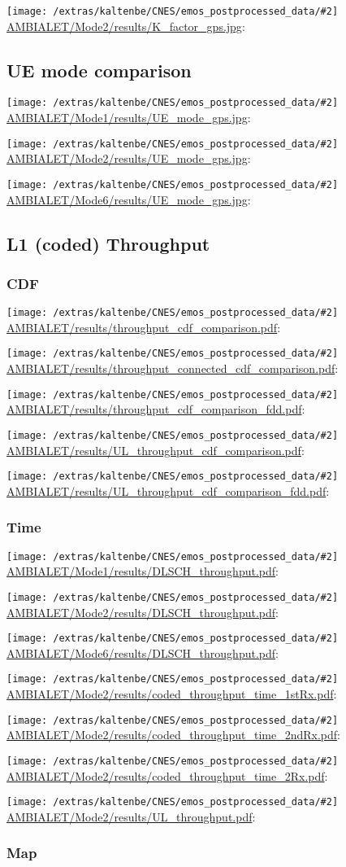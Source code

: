 \documentclass[a4paper,10pt]{article}
\newcommand{\printfile}[2][]{
 \begin{minipage}{8cm}
  \centering
  \texttt{[image: /extras/kaltenbe/CNES/emos\_postprocessed\_data/\#2]}
  \url{#2}: #1

 \end{minipage}
}
\begin{document}
\printfile{AMBIALET/Mode2/results/K_factor_gps.jpg}

\subsection{UE mode comparison}

\printfile{AMBIALET/Mode1/results/UE_mode_gps.jpg}
\printfile{AMBIALET/Mode2/results/UE_mode_gps.jpg}

\printfile{AMBIALET/Mode6/results/UE_mode_gps.jpg}

\subsection{L1 (coded) Throughput}


\subsubsection{CDF}


\printfile{AMBIALET/results/throughput_cdf_comparison.pdf}
\printfile{AMBIALET/results/throughput_connected_cdf_comparison.pdf}

\printfile{AMBIALET/results/throughput_cdf_comparison_fdd.pdf}

\printfile{AMBIALET/results/UL_throughput_cdf_comparison.pdf}
\printfile{AMBIALET/results/UL_throughput_cdf_comparison_fdd.pdf}

\subsubsection{Time}

\printfile{AMBIALET/Mode1/results/DLSCH_throughput.pdf}
\printfile{AMBIALET/Mode2/results/DLSCH_throughput.pdf}

\printfile{AMBIALET/Mode6/results/DLSCH_throughput.pdf}
\printfile{AMBIALET/Mode2/results/coded_throughput_time_1stRx.pdf}

\printfile{AMBIALET/Mode2/results/coded_throughput_time_2ndRx.pdf}
\printfile{AMBIALET/Mode2/results/coded_throughput_time_2Rx.pdf}

\printfile{AMBIALET/Mode2/results/UL_throughput.pdf}


\subsubsection{Map}
\end{document}

